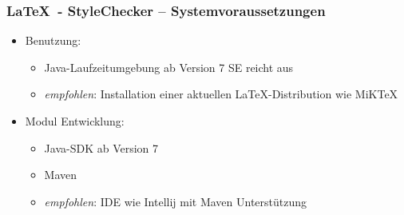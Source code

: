 \begin{frame}
\frametitle{\LaTeX~- StyleChecker -- Systemvoraussetzungen}
\begin{block}{\vspace*{-3ex}}
	\begin{itemize}
	  \item Benutzung: 
	  \begin{itemize}
	  	\item Java-Laufzeitumgebung ab Version 7 SE reicht aus
	  	\item \emph{empfohlen}: Installation einer aktuellen LaTeX-Distribution wie MiKTeX  
	  \end{itemize}
	  \item Modul Entwicklung: 
	  	\begin{itemize}
	  	  	\item Java-SDK ab Version 7
	  	  	\item Maven
	  	  	\item \emph{empfohlen}: IDE wie Intellij mit Maven Unterstützung
	  	\end{itemize}  	  
	\end{itemize}
\end{block}
\end{frame}

